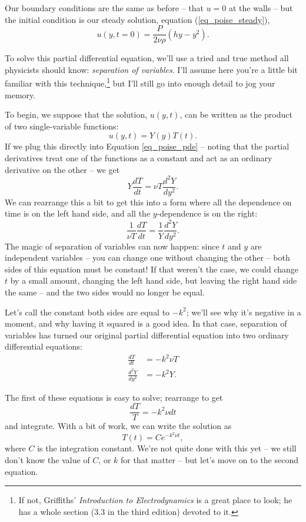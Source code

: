 Our boundary conditions are the same as before -- that $u = 0$ at the walls -- but the initial condition is our steady solution, equation (\ref{eq_poise_steady}),
\begin{equation}
\label{eq_poise_ic}
u(y, t=0) = \frac{P}{2\nu \rho} (hy - y^2).
\end{equation}

To solve this partial differential equation, we'll use a tried and true method all physicists should know:  \emph{separation of variables}.  I'll assume here you're a little bit familiar with this technique,\footnote{If not, Griffiths' \emph{Introduction to Electrodynamics} is a great place to look; he has a whole section (3.3 in the third edition) devoted to it.} but I'll still go into enough detail to jog your memory.

To begin, we suppose that the solution, $u(y, t)$, can be written as the product of two single-variable functions:
\begin{equation}
u(y, t) = Y(y) T(t).
\end{equation}
If we plug this directly into Equation \ref{eq_poise_pde} -- noting that the partial derivatives treat one of the functions as a constant and act as an ordinary derivative on the other -- we get
\[
Y \frac{dT}{dt} = \nu T \frac{d^2Y}{dy^2}.
\]
We can rearrange this a bit to get this into a form where all the dependence on time is on the left hand side, and all the $y$-dependence is on the right:
\[
\frac{1}{\nu T} \frac{dT}{dt} = \frac{1}{Y} \frac{d^2Y}{dy^2}.
\]
The magic of separation of variables can now happen:  since $t$ and $y$ are independent variables -- you can change one without changing the other -- both sides of this equation must be constant!  If that weren't the case, we could change $t$ by a small amount, changing the left hand side, but leaving the right hand side the same -- and the two sides would no longer be equal.

Let's call the constant both sides are equal to $-k^2$; we'll see why it's negative in a moment, and why having it squared is a good idea.  In that case, separation of variables has turned our original partial differential equation into two ordinary differential equations:
\begin{align}
\frac{dT}{dt} & = -k^2 \nu T \\
\label{eq_poise_sho} 
\frac{d^2Y}{dy^2} & = -k^2 Y.
\end{align}

The first of these equations is easy to solve; rearrange to get
\[
\frac{dT}{T} = -k^2 \nu dt
\]
and integrate.  With a bit of work, we can write the solution as
\begin{equation}
T(t) = C e^{-k^2 \nu t},
\end{equation}
where $C$ is the integration constant.  We're not quite done with this yet -- we still don't know the value of $C$, or $k$ for that matter -- but let's move on to the second equation.  

